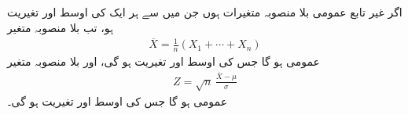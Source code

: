 \quad
اگر  غیر تابع عمومی بلا منصوبہ متغیرات ہوں جن میں سے ہر ایک کی اوسط  اور تغیریت  ہو، تب بلا منصوبہ متغیر
\begin{align}\label{مساوات-شماریات_غیر_تابع_متغیرات_اوسط_تغیریت_الف}
\overline{X}=\frac{1}{n}(X_1+\cdots+X_n)
\end{align}
عمومی ہو گا جس کی اوسط  اور تغیریت  ہو گی، اور بلا منصوبہ متغیر
\begin{align}\label{مساوات-شماریات_غیر_تابع_متغیرات_اوسط_تغیریت_ب}
Z=\sqrt{n}\,\frac{\overline{X}-\mu}{\sigma}
\end{align}
عمومی ہو گا جس کی اوسط  اور تغیریت  ہو گی۔


